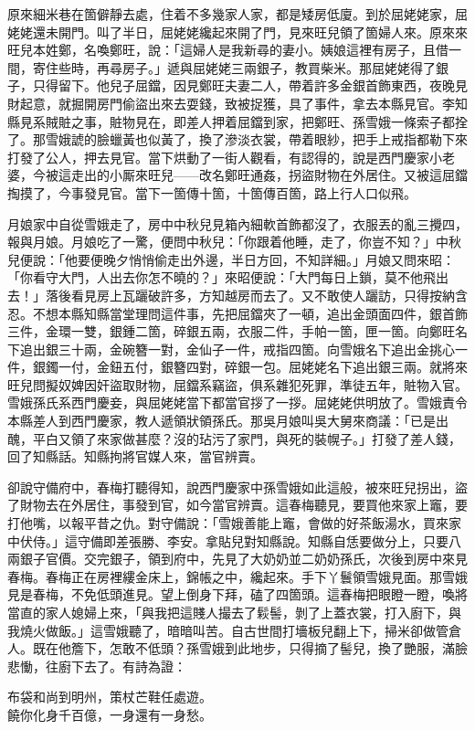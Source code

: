原來細米巷在箇僻靜去處，住着不多幾家人家，都是矮房低廈。到於屈姥姥家，屈姥姥還未開門。叫了半日，屈姥姥纔起來開了門，見來旺兒領了箇婦人來。原來來旺兒本姓鄭，名喚鄭旺，說：「這婦人是我新尋的妻小。姨娘這裡有房子，且借一間，寄住些時，再尋房子。」遞與屈姥姥三兩銀子，教買柴米。那屈姥姥得了銀子，只得留下。他兒子屈鐺，因見鄭旺夫妻二人，帶着許多金銀首飾東西，夜晚見財起意，就掘開房門偷盜出來去耍錢，致被捉獲，具了事件，拿去本縣見官。李知縣見系賊賍之事，賍物見在，即差人押着屈鐺到家，把鄭旺、孫雪娥一條索子都拴了。那雪娥諕的臉蠟黃也似黃了，換了滲淡衣裳，帶着眼紗，把手上戒指都勒下來打發了公人，押去見官。當下烘動了一街人觀看，有認得的，說是西門慶家小老婆，今被這走出的小厮來旺兒——改名鄭旺通姦，拐盜財物在外居住。又被這屈鐺掏摸了，今事發見官。當下一箇傳十箇，十箇傳百箇，路上行人口似飛。{}

月娘家中自從雪娥走了，房中中秋兒見箱內細軟首飾都沒了，衣服丟的亂三攪四，報與月娘。月娘吃了一驚，便問中秋兒：「你跟着他睡，走了，你豈不知？」中秋兒便說：「他要便晚夕悄悄偷走出外邊，半日方回，不知詳細。」月娘又問來昭：「你看守大門，人出去你怎不曉的？」來昭便說：「大門每日上鎖，莫不他飛出去！」落後看見房上瓦躧破許多，方知越房而去了。又不敢使人躧訪，只得按納含忍。不想本縣知縣當堂理問這件事，先把屈鐺夾了一頓，追出金頭面四件，銀首飾三件，金環一雙，銀鍾二箇，碎銀五兩，衣服二件，手帕一箇，匣一箇。向鄭旺名下追出銀三十兩，金碗簪一對，金仙子一件，戒指四箇。向雪娥名下追出金挑心一件，銀鐲一付，金鈕五付，銀簪四對，碎銀一包。屈姥姥名下追出銀三兩。就將來旺兒問擬奴婢因奸盜取財物，屈鐺系竊盜，俱系雜犯死罪，準徒五年，賍物入官。雪娥孫氏系西門慶妾，與屈姥姥當下都當官拶了一拶。屈姥姥供明放了。雪娥責令本縣差人到西門慶家，教人遞領狀領孫氏。那吳月娘叫吳大舅來商議：「已是出醜，平白又領了來家做甚麼？{}沒的玷污了家門，與死的裝幌子。」打發了差人錢，回了知縣話。知縣拘將官媒人來，當官辨賣。

卻說守備府中，春梅打聽得知，說西門慶家中孫雪娥如此這般，被來旺兒拐出，盜了財物去在外居住，事發到官，如今當官辨賣。這春梅聽見，要買他來家上竈，要打他嘴，以報平昔之仇。對守備說：「雪娥善能上竈，會做的好茶飯湯水，買來家中伏侍。」這守備即差張勝、李安。拿貼兒對知縣說。知縣自恁要做分上，只要八兩銀子官價。交完銀子，領到府中，先見了大奶奶並二奶奶孫氏，次後到房中來見春梅。春梅正在房裡縷金床上，錦帳之中，纔起來。{}手下丫鬟領雪娥見面。那雪娥見是春梅，不免低頭進見。望上倒身下拜，磕了四箇頭。這春梅把眼瞪一瞪，{}喚將當直的家人媳婦上來，「與我把這賤人撮去了鬏髻，剝了上蓋衣裳，打入廚下，與我燒火做飯。」這雪娥聽了，暗暗叫苦。自古世間打墻板兒翻上下，掃米卻做管倉人。既在他簷下，怎敢不低頭？孫雪娥到此地步，只得摘了髻兒，換了艷服，滿臉悲慟，往廚下去了。有詩為證：

\begin{myquote}
布袋和尚到明州，策杖芒鞋任處遊。\\饒你化身千百億，一身還有一身愁。
\end{myquote}

